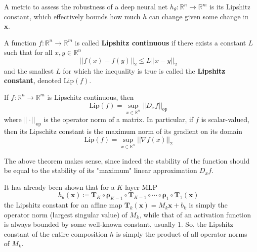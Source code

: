 \documentclass{article}
\begin{document}
      A metric to assess the robustness of a deep neural net $h_\theta: \mathbb{R}^n \longrightarrow \mathbb{R}^m$ is its Lipshitz constant, which effectively bounds how much $h$ can change given some change in $\mathbf{x}$. 

      \begin{definition}
        A function $f: \mathbb{R}^n \longrightarrow \mathbb{R}^m$ is called \textbf{Lipshitz continuous} if there exists a constant $L$ such that for all $x, y \in \mathbb{R}^n$
        \[||f(x) - f(y)||_2 \leq L ||x - y||_2\]
        and the smallest $L$ for which the inequality is true is called the \textbf{Lipshitz constant}, denoted $\mathrm{Lip}(f)$. 
      \end{definition}

      \begin{theorem}
        If $f: \mathbb{R}^n \longrightarrow \mathbb{R}^m$ is Lipschitz continuous, then 
          \[\mathrm{Lip}(f) = \sup_{x \in \mathbb{R}^n} ||D_x f||_{\mathrm{op}}\]
        where $||\cdot ||_{\mathrm{op}}$ is the operator norm of a matrix. In particular, if $f$ is scalar-valued, then its Lipschitz constant is the maximum norm of its gradient on its domain 
          \[\mathrm{Lip}(f) = \sup_{x \in \mathbb{R}^n} ||\nabla f(x)||_2\]
      \end{theorem}

      The above theorem makes sense, since indeed the stability of the function should be equal to the stability of its "maximum" linear approximation $D_x f$. 

      \begin{theorem}
        It has already been shown that for a $K$-layer MLP
        \[h_\theta (\mathbf{x}) \coloneqq \mathbf{T}_K \circ \boldsymbol{\rho}_{K-1} \circ \mathbf{T}_{K-1} \circ \cdots \circ \boldsymbol{\rho}_1 \circ \mathbf{T}_1 (\mathbf{x})\]
        the Lipshitz constant for an affine map $\mathbf{T}_k (\mathbf{x}) = M_k \mathbf{x} + b_k$ is simply the operator norm (largest singular value) of $M_k$, while that of an activation function is always bounded by some well-known constant, usually $1$. So, the Lipshitz constant of the entire composition $h$ is simply the product of all operator norms of $M_k$. 
      \end{theorem}
\end{document}
